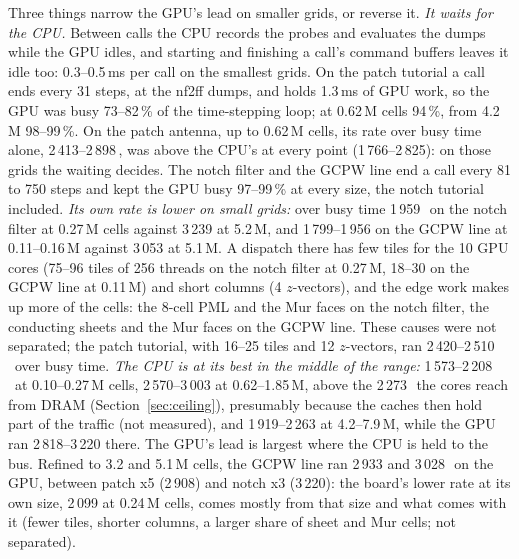 Three things narrow the GPU's lead on smaller grids, or reverse it. \emph{It waits for the CPU.} Between 
calls the CPU records the probes and evaluates the dumps while the GPU idles, and starting and finishing a call's
command buffers leaves it idle too: 0.3--0.5\,ms per call on the smallest grids. On the patch tutorial a call ends
every 31 steps, at the nf2ff dumps, and holds 1.3\,ms of GPU work, so the GPU was busy 73--82\,\% of the time-stepping
loop; at 0.62\,M cells 94\,\%, from 4.2\,M 98--99\,\%. On the patch antenna, up to 0.62\,M cells, its rate over busy time alone,
2\,413--2\,898\,\MC, was above the CPU's at every point (1\,766--2\,825): on those grids the waiting decides. The notch
filter and the GCPW line end a call every 81 to 750 steps and kept the GPU busy 97--99\,\% at every size, the notch
tutorial included. \emph{Its own rate is lower on small grids:} over busy time 1\,959\,\MC\ on the notch filter at
0.27\,M cells against 3\,239 at 5.2\,M, and 1\,799--1\,956 on the GCPW line at 0.11--0.16\,M against 3\,053 at
5.1\,M. A dispatch there has few tiles for the 10 GPU cores (75--96 tiles of 256 threads on the notch filter at 0.27\,M,
18--30 on the GCPW line at 0.11\,M) and short columns (4 $z$-vectors), and the edge work makes up
more of the cells: the 8-cell PML and the Mur faces on the notch filter, the conducting sheets and the Mur faces on
the GCPW line. These causes were not separated; the patch tutorial, with 16--25 tiles and 12 $z$-vectors, ran
2\,420--2\,510\,\MC\ over busy time. \emph{The CPU is at its best in the middle of the range:} 1\,573--2\,208\,\MC\ at
0.10--0.27\,M cells, 2\,570--3\,003 at 0.62--1.85\,M, above the 2\,273\,\MC\ the cores reach from DRAM
(Section~\ref{sec:ceiling}), presumably because the caches then hold part of the traffic (not measured), and
1\,919--2\,263 at 4.2--7.9\,M, while the GPU ran 2\,818--3\,220 there. The GPU's lead is largest where the CPU is held
to the bus. Refined to 3.2 and 5.1\,M cells, the GCPW line ran 2\,933 and 3\,028\,\MC\ on the GPU, between patch x5
(2\,908) and notch x3 (3\,220): the board's lower rate at its own size, 2\,099 at 0.24\,M cells, comes mostly from
that size and what comes with it (fewer tiles, shorter columns, a larger share of sheet and Mur cells; not separated).

